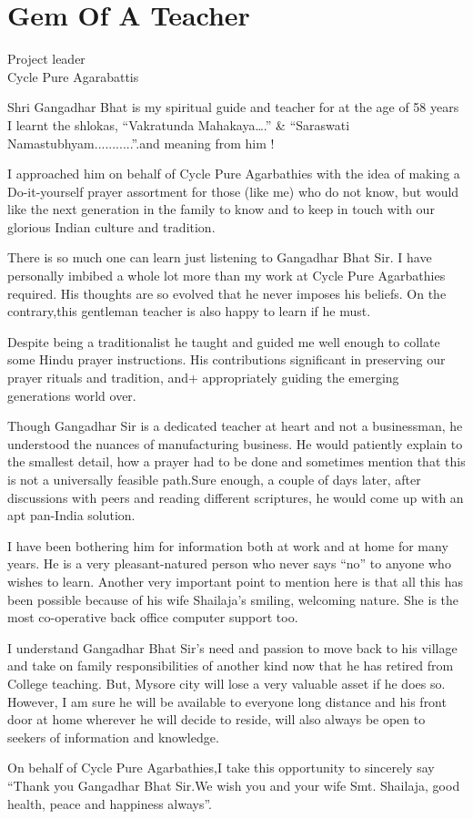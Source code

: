 \chapter{Gem Of A Teacher}

\begin{center}

\smallskip

Project leader\\
Cycle Pure Agarabattis

\addrule
\end{center}
Shri Gangadhar Bhat is my spiritual guide and teacher for at the age of 58 years I learnt the shlokas, “Vakratunda Mahakaya….” \& “Saraswati Namastubhyam...........”.and meaning from him !

I approached him on behalf of Cycle Pure Agarbathies with the idea of making a Do-it-yourself prayer assortment for those (like me) who do not know, but would like the next generation in the family to know and to keep in touch with our glorious Indian culture and tradition.

There is so much one can learn just listening to Gangadhar Bhat Sir. I have personally imbibed a whole lot more than my work at Cycle Pure Agarbathies required. His thoughts are so evolved that he never imposes his beliefs. On the contrary,this gentleman teacher is also happy to learn if he must.

Despite being a traditionalist he taught and guided me well enough to collate some Hindu prayer instructions. His contributions significant in preserving our prayer rituals and tradition, and+ appropriately guiding the emerging generations world over.

Though Gangadhar Sir is a dedicated teacher at heart and not a businessman, he understood the nuances of manufacturing business. He would patiently explain to the smallest detail, how a prayer had to be done and sometimes mention that this is not a universally feasible path.Sure enough, a couple of days later, after discussions with peers and reading different scriptures, he would come up with an apt pan-India solution.

I have been bothering him for information both at work and at home for many years. He is a very pleasant-natured person who never says “no” to anyone who wishes to learn. Another very important point to mention here is that all this has been possible because of his wife Shailaja’s smiling, welcoming nature. She is the most co-operative back office computer support too. 

I understand Gangadhar Bhat Sir’s need and passion to move back to his village and take on family responsibilities of another kind now that he has retired from College teaching. But, Mysore city will lose a very valuable asset if he does so. However, I am sure he will be available to everyone long distance and his front door at home wherever he will decide to reside, will also always be open to seekers of information and knowledge.

On behalf of Cycle Pure Agarbathies,I take this opportunity to sincerely say “Thank you Gangadhar Bhat Sir.We wish you and your wife Smt. Shailaja, good health, peace and happiness always”.

\articleend
